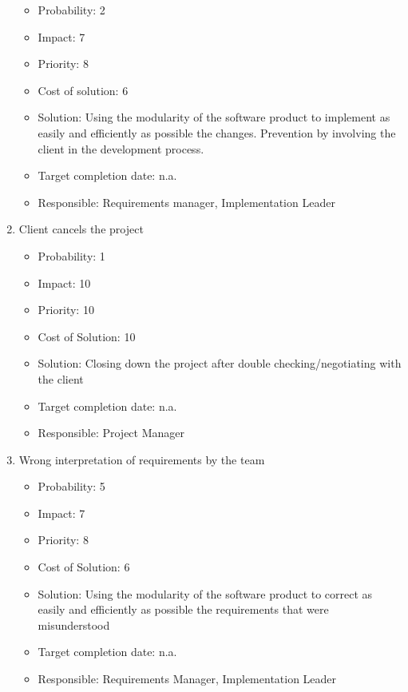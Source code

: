 \documentclass[9pt]{article}
\begin{document}
\begin{enumerate}
  \begin{itemize}
  \itemsep1pt\parskip0pt
  \item
    Probability: 2
  \item
    Impact: 7
  \item
    Priority: 8
  \item
    Cost of solution: 6
  \item
    Solution: Using the modularity of the software product to implement
    as easily and efficiently as possible the changes. Prevention by
    involving the client in the development process.
  \item
    Target completion date: n.a.
  \item
    Responsible: Requirements manager, Implementation Leader
  \end{itemize}
\item
  Client cancels the project

  \begin{itemize}
  \itemsep1pt\parskip0pt
  \item
    Probability: 1
  \item
    Impact: 10
  \item
    Priority: 10
  \item
    Cost of Solution: 10
  \item
    Solution: Closing down the project after double checking/negotiating
    with the client
  \item
    Target completion date: n.a.
  \item
    Responsible: Project Manager
  \end{itemize}
\item
  Wrong interpretation of requirements by the team

  \begin{itemize}
  \itemsep1pt\parskip0pt
  \item
    Probability: 5
  \item
    Impact: 7
  \item
    Priority: 8
  \item
    Cost of Solution: 6
  \item
    Solution: Using the modularity of the software product to correct as
    easily and efficiently as possible the requirements that were
    misunderstood
  \item
    Target completion date: n.a.
  \item
    Responsible: Requirements Manager, Implementation Leader
  \end{itemize}
\end{enumerate}
\end{document}
